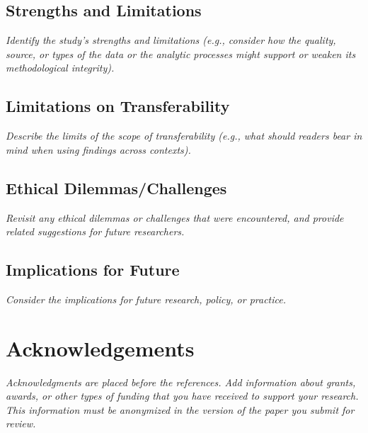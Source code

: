 \documentclass[acmsmall]{acmart}
\begin{document}
\subsection{Strengths and Limitations}

{\em\small Identify the study’s strengths and limitations (e.g., consider how the quality, source, or types of the data or the analytic processes might support or weaken its methodological integrity).}

\subsection{Limitations on Transferability}

{\em\small Describe the limits of the scope of transferability (e.g., what should readers bear in mind when using findings across contexts). }

\subsection{Ethical Dilemmas/Challenges}

{\em\small Revisit any ethical dilemmas or challenges that were encountered, and provide related suggestions for future researchers. }

\subsection{Implications for Future}

{\em\small Consider the implications for future research, policy, or practice.}

\section{Acknowledgements}

{\em\small Acknowledgments are placed before the references. Add information about grants, awards, or other types of funding that you have received to support your research. This information must be anonymized in the version of the paper you submit for review. }




\appendix
\end{document}
